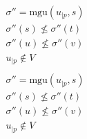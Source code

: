 \begin{figure}
  \begin{center}

    \DP{} \\[12pt]

    \DP{}
    $\begin{matrix}
        \sigma'' = \text{mgu}(u_{|p}, s) \\
        \sigma''(s) \not\leq \sigma''(t) \\
        \sigma''(u) \not\leq \sigma''(v) \\
        u_{|p} \not\in V \\
    \end{matrix}$ \\[12pt]

    \DP{}
    $\begin{matrix}
        \sigma'' = \text{mgu}(u_{|p}, s) \\
        \sigma''(s) \not\leq \sigma''(t) \\
        \sigma''(u) \not\leq \sigma''(v) \\
        u_{|p} \not\in V \\
    \end{matrix}$ \\[12pt]

    \doubleLine{}
    \DP{} \\[12pt]

    \doubleLine{}
    \DP{} \\[12pt]



\end{center}
\end{figure}
